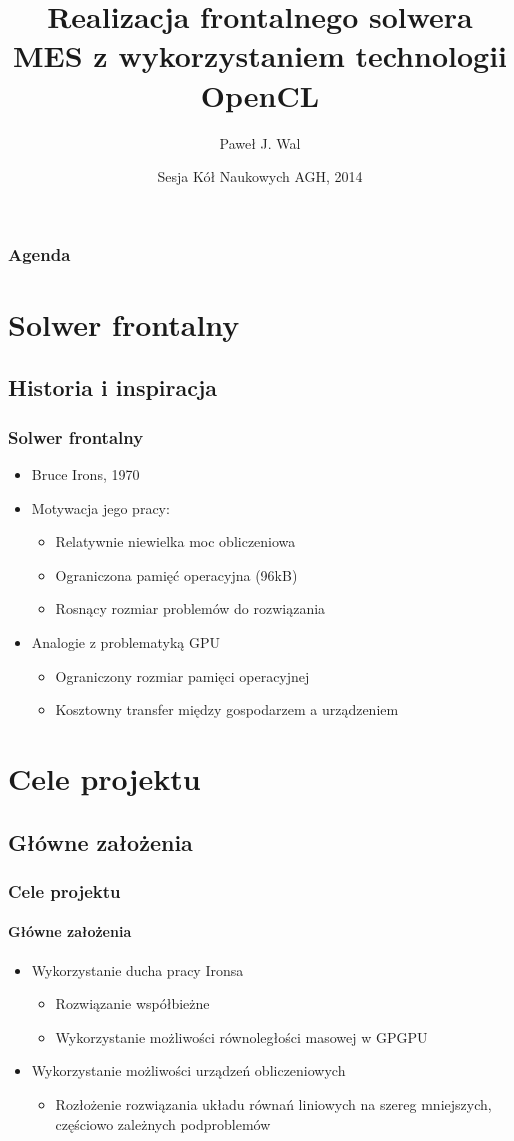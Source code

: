 \documentclass{beamer}
\title[Realizacja frontalnego solwera MES]{Realizacja frontalnego solwera MES z wykorzystaniem technologii OpenCL}
\author{Paweł J. Wal}
\institute{Wydział Inżynierii Metali i Informatyki Przemysłowej}
\date{Sesja Kół Naukowych AGH, 2014}
\begin{document}
	\frame{\titlepage}	

\begin{frame}[shrink]
\frametitle{Agenda}
\tableofcontents
\end{frame}	

\section{Solwer frontalny}	
\subsection{Historia i inspiracja}	
	
  \begin{frame}
    \frametitle{Solwer frontalny}

	\begin{itemize}[<+->]
		\item Bruce Irons, 1970
		\item Motywacja jego pracy:
		\begin{itemize}	
			\item Relatywnie niewielka moc obliczeniowa
			\item Ograniczona pamięć operacyjna (96kB)
			\item Rosnący rozmiar problemów do rozwiązania			
		\end{itemize}
		\item Analogie z problematyką GPU
		\begin{itemize}	
			\item Ograniczony rozmiar pamięci operacyjnej
			\item Kosztowny transfer między gospodarzem a urządzeniem
		\end{itemize}
	\end{itemize}
  \end{frame}

\section{Cele projektu}  
\subsection{Główne założenia}
  \begin{frame}
    \frametitle{Cele projektu}
    \framesubtitle{Główne założenia}
	\begin{itemize}[<+->]
	\item Wykorzystanie ducha pracy Ironsa
		\begin{itemize}
		\item Rozwiązanie współbieżne
		\item Wykorzystanie możliwości równoległości masowej w GPGPU
		\end{itemize}
	\item Wykorzystanie możliwości urządzeń obliczeniowych
		\begin{itemize}
			\item Rozłożenie rozwiązania układu równań liniowych na szereg mniejszych, częściowo zależnych podproblemów
		\end{itemize}
	\end{itemize}
  \end{frame}
\end{document}
